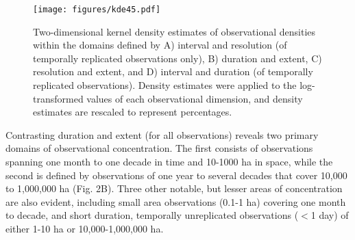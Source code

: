 \documentclass[12pt]{article}
\begin{document}

\begin{figure}[!ht]
\texttt{[image: figures/kde45.pdf]}
\vspace{-0.15 cm}
\caption{Two-dimensional kernel density estimates of observational densities within the domains defined by A) interval and resolution (of temporally replicated observations only), B) duration and extent, C) resolution and extent, and D) interval and duration (of temporally replicated observations). Density estimates were applied to the log-transformed values of each observational dimension, and density estimates are rescaled to represent percentages.}
\label{afoto1}
\end{figure}

Contrasting duration and extent (for all observations) reveals two primary domains of observational concentration. The first consists of observations spanning one month to one decade in time and 10-1000 ha in space, while the second is defined by observations of one year to several decades that cover 10,000 to 1,000,000 ha (Fig. 2B).  Three other notable, but lesser areas of concentration are also evident, including small area observations (0.1-1 ha) covering one month to decade, and short duration, temporally unreplicated observations ($<$1 day) of either 1-10 ha or 10,000-1,000,000 ha. 

\end{document}
